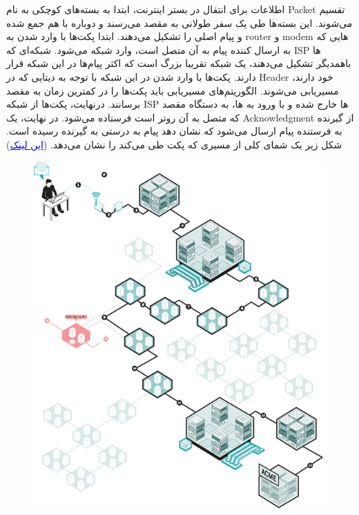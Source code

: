 \documentclass[]{article}
\newcommand{\link}[2]{\href{#1}{\textcolor{blue}{#2}}}
\begin{document}
اطلاعات برای انتقال در بستر اینترنت، ابتدا به بسته‌های کوچکی به نام  Packet تقسیم می‌شوند. این بسته‌ها طی یک سفر طولانی به مقصد می‌رسند و دوباره با هم جمع شده و پیام اصلی را تشکیل می‌دهند.
ابتدا پکت‌ها با وارد شدن به router و modem هایی که به ارسال کننده پیام به آن متصل است، وارد شبکه  می‌شود. شبکه‌ای که ISP ها باهمدیگر تشکیل می‌دهند، یک شبکه تقریبا بزرگ است که اکثر پیام‌ها در این شبکه قرار دارند. پکت‌ها با وارد شدن در این شبکه با توجه به دیتایی که در Header خود دارند، مسیریابی می‌شوند. الگوریتم‌های مسیریابی باید پکت‌ها را در کمترین زمان به مقصد برسانند. درنهایت، پکت‌ها از شبکه ISP ها خارج شده و با ورود به ها، به دستگاه مقصد که متصل به آن روتر است فرستاده می‌شود. در نهایت، یک Acknowledgment از گیرنده به فرستنده پیام ارسال می‌شود که نشان دهد پیام به درستی به گیرنده رسیده است.
شکل زیر یک شمای کلی از مسیری که پکت طی می‌کند را نشان می‌دهد. (\link{https://www.washingtonpost.com/graphics/national/security-of-the-internet/bgp/}{این لینک})

\begin{figure}[H]
	\centerline{\includegraphics[scale=1]{resources/Dataflow.png}}
\end{figure}
\end{document}
